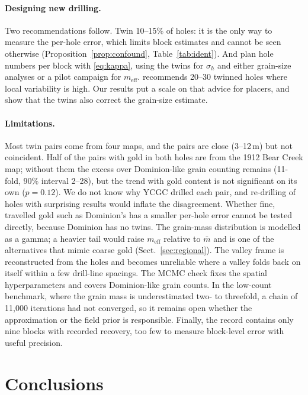 \documentclass[11pt,a4paper]{article}
\theoremstyle{remark}
\newcommand{\meff}{m_{\mathrm{eff}}}
\newcommand{\mbar}{\bar m}
\begin{document}
\paragraph{Designing new drilling.} Two recommendations follow. Twin 10--15\% of holes: it is the only way to measure the per-hole error, which limits block estimates and cannot be seen otherwise (Proposition~\ref{prop:confound}, Table~\ref{tab:ident}). And plan hole numbers per block with \eqref{eq:kappa}, using the twins for $\sigma_h$ and either grain-size analyses or a pilot campaign for $\meff$. \citet{Abzalov2009} recommends 20--30 twinned holes where local variability is high. Our results put a scale on that advice for placers, and show that the twins also correct the grain-size estimate.

\paragraph{Limitations.} Most twin pairs come from four maps, and the pairs are close (3--12\,m) but not coincident. Half of the pairs with gold in both holes are from the 1912 Bear Creek map; without them the excess over Dominion-like grain counting remains (11-fold, 90\% interval 2--28), but the trend with gold content is not significant on its own ($p = 0.12$). We do not know why YCGC drilled each pair, and re-drilling of holes with surprising results would inflate the disagreement. Whether fine, travelled gold such as Dominion's has a smaller per-hole error cannot be tested directly, because Dominion has no twins. The grain-mass distribution is modelled as a gamma; a heavier tail would raise $\meff$ relative to $\mbar$ and is one of the alternatives that mimic coarse gold (Sect.~\ref{sec:regional}). The valley frame is reconstructed from the holes and becomes unreliable where a valley folds back on itself within a few drill-line spacings. The MCMC check fixes the spatial hyperparameters and covers Dominion-like grain counts. In the low-count benchmark, where the grain mass is underestimated two- to threefold, a chain of 11,000 iterations had not converged, so it remains open whether the approximation or the field prior is responsible. Finally, the record contains only nine blocks with recorded recovery, too few to measure block-level error with useful precision.

\section{Conclusions}
\end{document}
